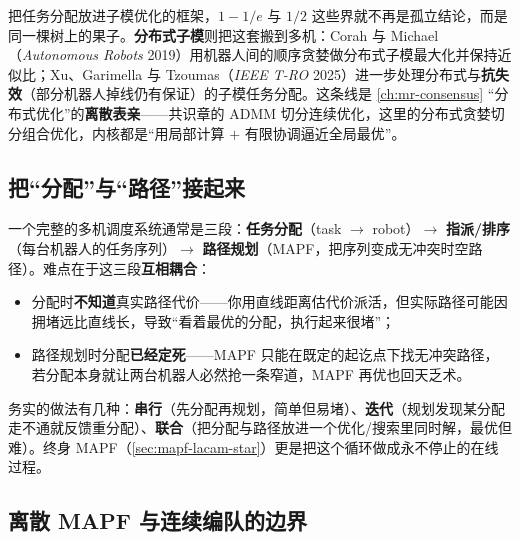 把任务分配放进子模优化的框架，$1-1/e$ 与 $1/2$ 这些界就不再是孤立结论，而是同一棵树上的果子。\textbf{分布式子模}则把这套搬到多机：Corah 与 Michael（\emph{Autonomous Robots} 2019）用机器人间的顺序贪婪做分布式子模最大化并保持近似比\cite{corah2019distributed}；Xu、Garimella 与 Tzoumas（\emph{IEEE T-RO} 2025）进一步处理分布式与\textbf{抗失效}（部分机器人掉线仍有保证）的子模任务分配\cite{xu2025distributed}。这条线是 \cref{ch:mr-consensus} “分布式优化”的\textbf{离散表亲}——共识章的 ADMM 切分连续优化，这里的分布式贪婪切分组合优化，内核都是“用局部计算 $+$ 有限协调逼近全局最优”。

\subsection{把“分配”与“路径”接起来}
\label{sec:mapf-submod-pipeline}

一个完整的多机调度系统通常是三段：\textbf{任务分配}（task $\to$ robot）$\to$ \textbf{指派/排序}（每台机器人的任务序列）$\to$ \textbf{路径规划}（MAPF，把序列变成无冲突时空路径）。难点在于这三段\textbf{互相耦合}：

\begin{itemize}
  \item 分配时\textbf{不知道}真实路径代价——你用直线距离估代价派活，但实际路径可能因拥堵远比直线长，导致“看着最优的分配，执行起来很堵”；
  \item 路径规划时分配\textbf{已经定死}——MAPF 只能在既定的起讫点下找无冲突路径，若分配本身就让两台机器人必然抢一条窄道，MAPF 再优也回天乏术。
\end{itemize}

务实的做法有几种：\textbf{串行}（先分配再规划，简单但易堵）、\textbf{迭代}（规划发现某分配走不通就反馈重分配）、\textbf{联合}（把分配与路径放进一个优化/搜索里同时解，最优但难）。终身 MAPF（\cref{sec:mapf-lacam-star}）更是把这个循环做成永不停止的在线过程。

\subsection{离散 MAPF 与连续编队的边界}
\label{sec:mapf-submod-boundary}

